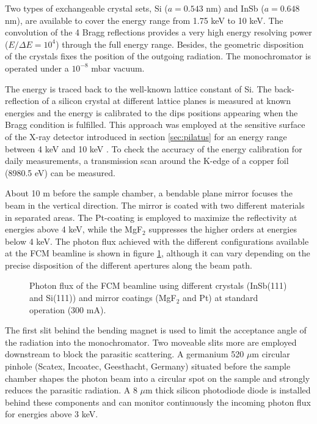 Two types of exchangeable crystal sets, Si ($a=0.543$ nm) and InSb ($a=0.648$ nm), are available to cover the energy range from 1.75 keV to 10 keV. The convolution of the 4 Bragg reflections provides a very high energy resolving power ($E/\Delta E = 10^4 $) through the full energy range. Besides, the geometric disposition of the crystals fixes the position of the outgoing radiation. The monochromator is operated under a $10^{-8}$ mbar vacuum.

The energy is traced back to the well-known lattice constant of Si. The back-reflection of a silicon crystal at different lattice planes is measured at known energies and the energy is calibrated to the dips positions appearing when the Bragg condition is fulfilled. This approach was employed at the sensitive surface of the X-ray detector introduced in section \ref{sec:pilatus} for an energy range between 4 keV and 10 keV \citep{gollwitzer_diffraction_2014}. To check the accuracy of the energy calibration for daily measurements, a transmission scan around the K-edge of a copper foil (8980.5 eV) can be measured.

About 10 m before the sample chamber, a bendable plane mirror focuses the beam in the vertical direction. The mirror is coated with two different materials in separated areas. The Pt-coating is employed to maximize the reflectivity at energies above 4 keV, while the MgF$_2$ suppresses the higher orders at energies below 4 keV. The photon flux achieved with the different configurations available at the FCM beamline is shown in figure \ref{fig:FCMBeamlineFlux}, although it can vary depending on the precise disposition of the different apertures along the beam path.

\begin{figure}%
	\centering
		
		\caption[Photon flux of the FCM beamline.]{Photon flux of the FCM beamline using different crystals (InSb(111) and Si(111)) and mirror coatings (MgF$_2$ and Pt) at standard operation (300 mA).}
		\label{fig:FCMBeamlineFlux}
\end{figure}

The first slit behind the bending magnet is used to limit the acceptance angle of the radiation into the monochromator. Two moveable slits more are employed downstream to block the parasitic scattering. A germanium 520 $\mu$m circular pinhole (Scatex, Incoatec, Geesthacht, Germany) situated before the sample chamber shapes the photon beam into a circular spot on the sample and strongly reduces the parasitic radiation. A 8 $\mu$m thick silicon photodiode diode is installed behind these components and can monitor continuously the incoming photon flux for energies above 3 keV.

